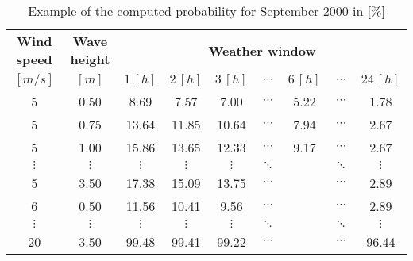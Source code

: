 \begin{table}
\label{tab:proba}
\begin{tabular}{ccccccccc}
\hline
{\bf Wind speed} & {\bf Wave height} & \multicolumn{ 7}{c}{{\bf Weather window}} \\
$[m/s]$      &      $[m]$      &          $1\, [h]$ &          $2\, [h]$ &          $3\, [h]$ &  $\cdots$ & $6\, [h]$  & $\cdots$ &        $24\, [h]$ \\
\hline
5 &       0.50 &       8.69 &       7.57 &       7.00 &  $\cdots$ & 5.22 & $\cdots$ &      1.78 \\
5 &       0.75 &      13.64 &      11.85 &      10.64 &  $\cdots$ & 7.94 & $\cdots$ &      2.67 \\
5 &       1.00 &      15.86 &      13.65 &      12.33 &  $\cdots$ & 9.17 & $\cdots$ &      2.67 \\
 $\vdots$ &  $\vdots$ &  $\vdots$ &  $\vdots$ &  $\vdots$ &  $\ddots$ & & $\ddots$ &  $\vdots$ \\
5 &       3.50 &      17.38 &      15.09 &      13.75 &  $\cdots$ & & $\cdots$ &       2.89 \\
6 &       0.50 &      11.56 &      10.41 &       9.56 &  $\cdots$ & & $\cdots$ &      2.89 \\
 $\vdots$ &  $\vdots$ &  $\vdots$ &  $\vdots$ &  $\vdots$ & $\ddots$ & &        $\ddots$ &  $\vdots$ \\
20 &       3.50 &      99.48 &      99.41 &      99.22 &  $\cdots$ & & $\cdots$ &      96.44 \\
\hline
\end{tabular}  

\caption{Example of the computed probability for September 2000 in [\%]}
\end{table}